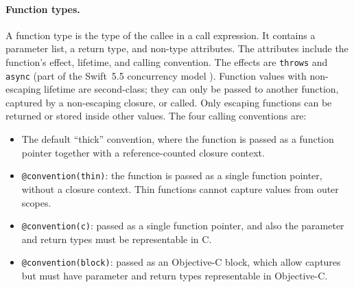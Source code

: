 \documentclass[../generics]{subfiles}
\begin{document}
\paragraph{Function types.} A function type is the type of the callee in a call expression. It contains a parameter list, a return type, and non-type attributes. The attributes include the function's effect, lifetime, and calling convention. The effects are \texttt{throws} and \texttt{async} (part of the Swift~5.5 concurrency model \cite{se0296}). Function values with non-escaping lifetime are second-class; they can only be passed to another function, captured by a non-escaping closure, or called. Only escaping functions can be returned or stored inside other values. The four calling conventions are:
\begin{itemize}
\item The default ``thick'' convention, where the function is passed as a function pointer together with a reference-counted closure context.
\item \texttt{@convention(thin)}: the function is passed as a single function pointer, without a closure context. Thin functions cannot capture values from outer scopes.
\item \texttt{@convention(c)}: passed as a single function pointer, and also the parameter and return types must be representable in C.
\item \texttt{@convention(block)}: passed as an Objective-C block, which allow captures but must have parameter and return types representable in Objective-C.
\end{itemize}
\end{document}
